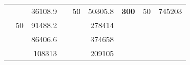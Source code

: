 \begin{table}[H]
\begin{tabular}{|ccrccrccc}
\rowcolor[HTML]{DDFDFF} 
\multicolumn{1}{|c|}{\cellcolor[HTML]{FFFFC7}}                                & \multicolumn{1}{c|}{\cellcolor[HTML]{DDFDFF}}                      & \multicolumn{1}{r|}{\cellcolor[HTML]{DAE8FC}36108.9}   & \multicolumn{1}{c|}{\cellcolor[HTML]{FFFFC7}}                                & \multicolumn{1}{c|}{\multirow{-10}{*}{\cellcolor[HTML]{DDFDFF}50}}  & \multicolumn{1}{r|}{\cellcolor[HTML]{DDFDFF}50305.8}   & \multicolumn{1}{c|}{\multirow{-19}{*}{\cellcolor[HTML]{FFFFC7}\textbf{300}}} & \multicolumn{1}{c|}{\multirow{-10}{*}{\cellcolor[HTML]{DDFDFF}50}} & \multicolumn{1}{r|}{\cellcolor[HTML]{DDFDFF}745203}    \\ \cline{3-3} \cline{5-9} 
\multicolumn{1}{|c|}{\cellcolor[HTML]{FFFFC7}}                                & \multicolumn{1}{c|}{\multirow{-10}{*}{\cellcolor[HTML]{DDFDFF}50}} & \multicolumn{1}{r|}{\cellcolor[HTML]{DDFDFF}91488.2}   & \multicolumn{1}{c|}{\cellcolor[HTML]{FFFFC7}}                                & \multicolumn{1}{c|}{\cellcolor[HTML]{DAE8FC}}                       & \multicolumn{1}{r|}{\cellcolor[HTML]{DAE8FC}278414}    &                                                                              &                                                                    &                                                        \\ \cline{2-3} \cline{6-6}
\multicolumn{1}{|c|}{\cellcolor[HTML]{FFFFC7}}                                & \multicolumn{1}{c|}{\cellcolor[HTML]{DAE8FC}}                      & \multicolumn{1}{r|}{\cellcolor[HTML]{DAE8FC}86406.6}   & \multicolumn{1}{c|}{\cellcolor[HTML]{FFFFC7}}                                & \multicolumn{1}{c|}{\cellcolor[HTML]{DAE8FC}}                       & \multicolumn{1}{r|}{\cellcolor[HTML]{DDFDFF}374658}    &                                                                              &                                                                    &                                                        \\ \cline{3-3} \cline{6-6}
\multicolumn{1}{|c|}{\cellcolor[HTML]{FFFFC7}}                                & \multicolumn{1}{c|}{\cellcolor[HTML]{DAE8FC}}                      & \multicolumn{1}{r|}{\cellcolor[HTML]{DDFDFF}108313}    & \multicolumn{1}{c|}{\cellcolor[HTML]{FFFFC7}}                                & \multicolumn{1}{c|}{\cellcolor[HTML]{DAE8FC}}                       & \multicolumn{1}{r|}{\cellcolor[HTML]{DAE8FC}209105}    &                                                                              &                                                                    &                                                        \\ \cline{3-3} \cline{6-6}

\end{tabular}
\end{table}
